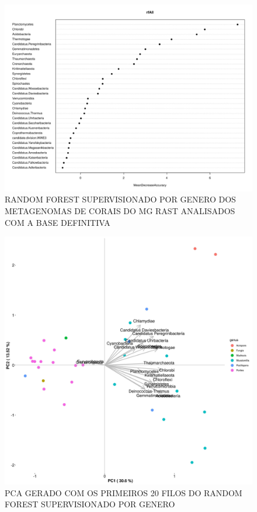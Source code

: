 \documentclass[12pt, a4paper]{report}
\begin{document}
\begin{figure}[H]
\centering
\includegraphics[scale=0.4]{figures/randomforest_supervisionado_genero_corais_leticia_2018_10_23.png}
\caption{RANDOM FOREST SUPERVISIONADO POR GENERO DOS METAGENOMAS DE CORAIS DO MG RAST ANALISADOS COM A BASE DEFINITIVA}
\end{figure}

\begin{figure}[H]
\centering
\includegraphics[scale=0.4]{figures/pca_corais_mg_rast_rf_supervisionado_genus_20_filos_23_10_2018.jpg}
\caption{PCA GERADO COM OS PRIMEIROS 20 FILOS DO RANDOM FOREST SUPERVISIONADO POR GENERO}
\end{figure}
\end{document}
